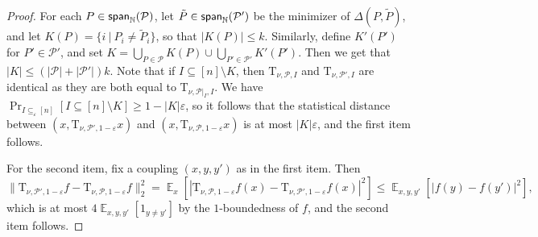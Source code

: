 \documentclass[11pt]{article}
\newcommand\card[1]{\left| {#1} \right|}
\newcommand\Prob[2]{{\Pr_{#1}\left[ {#2} \right]}}
\newcommand\norm[1]{\| #1 \|}
\newcommand\Expect[2]{{\mathop{\mathbb{E}}_{#1}\left[ {#2} \right]}}
\newcommand\spn{{\sf span}_{\mathbb{N}}}
\newcommand\eps{\varepsilon}
\renewcommand\geq{\geqslant}
\renewcommand\leq{\leqslant}
\begin{document}
\begin{proof}
    For each $P\in \spn(\mathcal{P})$, let $\tilde{P}\in\spn(\mathcal{P}')$ be the minimizer of $\Delta(P,\tilde{P})$, and let $K(P) = \{i~|~P_i\neq \tilde{P}_i\}$, so that $\card{K(P)}\leq k$. Similarly, define $K'(P')$ for $P'\in\mathcal{P}'$, and set $K = \bigcup_{P\in\mathcal{P}}K(P)\cup \bigcup_{P'\in\mathcal{P}'}K'(P')$. Then we get that $\card{K}\leq (\card{\mathcal{P}}+|\mathcal{P}'|)k$. Note that if $I\subseteq [n]\setminus K$, then $\mathrm{T}_{\nu,\mathcal{P},I}$ and $\mathrm{T}_{\nu,\mathcal{P}',I}$ are identical as they are both equal to $\mathrm{T}_{\nu,\mathcal{P}|_{I},I}$. We have $\Prob{I\subseteq_{\eps}[n]}{I\subseteq [n]\setminus K}\geq 1-\card{K}\eps$, so it follows that the statistical distance between $(x, \mathrm{T}_{\nu, \mathcal{P}', 1-\eps}x)$ and 
    $(x, \mathrm{T}_{\nu, \mathcal{P}, 1-\eps}x)$ is at most $\card{K}\eps$, and the first item follows.

    For the second item, fix a coupling $(x,y,y')$ as in the first item. Then
    \[
    \norm{\mathrm{T}_{\nu, \mathcal{P}', 1-\eps} f - \mathrm{T}_{\nu, \mathcal{P}, 1-\eps} f}_2^2
    =\Expect{x}{
    \card{\mathrm{T}_{\nu, \mathcal{P}, 1-\eps} f(x)
    -\mathrm{T}_{\nu, \mathcal{P}', 1-\eps} f(x)}^2}
    \leq \Expect{x,y,y'}{\card{f(y)-f(y')}^2},
    \]
    which is at most $4\Expect{x,y,y'}{1_{y\neq y'}}$ by the $1$-boundedness of $f$, and the second item follows.
\end{proof}
\end{document}
